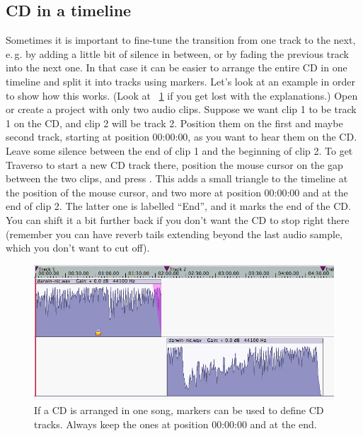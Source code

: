 \subsection{CD in a timeline}
Sometimes it is important to fine-tune the transition from one track to the next, e.\,g. by adding a little bit of silence in between, or by fading the previous track into the next one. In that case it can be easier to arrange the entire CD in one timeline and split it into tracks using markers. Let's look at an example in order to show how this works. (Look at \FigT~\ref{fig_markers01} if you get lost with the explanations.) Open or create a project with only two audio clips. Suppose we want clip 1 to be track 1 on the CD, and clip 2 will be track 2. Position them on the first and maybe second track, starting at position 00:00:00, as you want to hear them on the CD. Leave some silence between the end of clip 1 and the beginning of clip 2. To get Traverso to start a new CD track there, position the mouse cursor on the gap between the two clips, and press . This adds a small triangle to the timeline at the position of the mouse cursor, and two more at position 00:00:00 and at the end of clip 2. The latter one is labelled ``End'', and it marks the end of the CD. You can shift it a bit further back if you don't want the CD to stop right there (remember you  can have reverb tails extending beyond the last audio sample, which you don't want to cut off).

\begin{figure}[t]
 \centering\includegraphics[width=\textwidth]{images/markers01}
 \caption{If a CD is arranged in one song, markers can be used to define CD tracks. Always keep the ones at position 00:00:00 and at the end.}
 \label{fig_markers01}
\end{figure}

